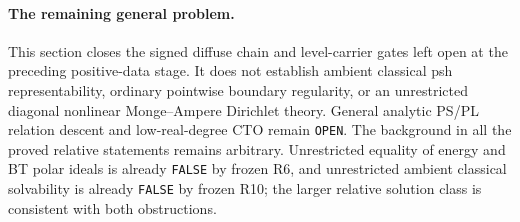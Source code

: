\paragraph{The remaining general problem.}
This section closes the signed diffuse chain and level-carrier
gates left open at the preceding positive-data stage.  It does
not establish ambient classical psh representability, ordinary
pointwise boundary regularity, or an unrestricted diagonal nonlinear Monge--Ampere
Dirichlet theory.  General analytic PS/PL relation descent and
low-real-degree CTO remain \texttt{OPEN}.  The background in
all the proved relative statements remains arbitrary.
Unrestricted equality of energy and BT polar ideals is already
\texttt{FALSE} by frozen R6, and unrestricted ambient classical
solvability is already \texttt{FALSE} by frozen R10; the larger
relative solution class is consistent with both obstructions.
